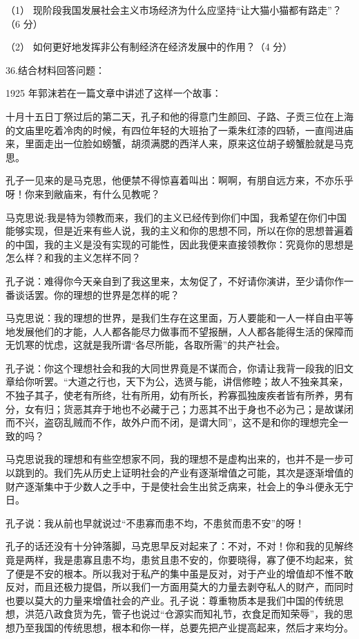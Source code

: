 \documentclass[UTF8,11pt]{ctexart}
\begin{document}
（1） 现阶段我国发展社会主义市场经济为什么应坚持“让大猫小猫都有路走”？（6 分）


（2） 如何更好地发挥非公有制经济在经济发展中的作用？（4 分）


36.结合材料回答问题：

1925 年郭沫若在一篇文章中讲述了这样一个故事：

十月十五日丁祭过后的第二天，孔子和他的得意门生颜回、子路、子贡三位在上海的文庙里吃着冷肉的时候，有四位年轻的大班抬了一乘朱红漆的四轿，一直闯进庙来，里面走出一位脸如螃蟹，胡须满腮的西洋人来，原来这位胡子螃蟹脸就是马克思。

孔子一见来的是马克思，他便禁不得惊喜着叫出：啊啊，有朋自远方来，不亦乐乎呀！你来到敝庙来，有什么见教呢？

马克思说:我是特为领教而来，我们的主义已经传到你们中国，我希望在你们中国能够实现，但是近来有些人说，我的主义和你的思想不同，所以在你的思想普遍着的中国，我的主义是没有实现的可能性，因此我便来直接领教你：究竟你的思想是怎么样？和我的主义怎样不同？

孔子说：难得你今天亲自到了我这里来，太匆促了，不好请你演讲，至少请你作一番谈话罢。你的理想的世界是怎样的呢？

马克思说：我的理想的世界，是我们生存在这里面，万人要能和一人一样自由平等地发展他们的才能，人人都各能尽力做事而不望报酬，人人都各能得生活的保障而无饥寒的忧虑，这就是我所谓“各尽所能，各取所需”的共产社会。

孔子说：你这个理想社会和我的大同世界竟是不谋而合，你请让我背一段我的旧文章给你听罢。“大道之行也，天下为公，选贤与能，讲信修睦；故人不独亲其亲，不独子其子，使老有所终，壮有所用，幼有所长，矜寡孤独废疾者皆有所养，男有分，女有归；货恶其弃于地也不必藏于己；力恶其不出于身也不必为己；是故谋闭而不兴，盗窃乱贼而不作，故外户而不闭，是谓大同”，这不是和你的理想完全一致的吗？

马克思说我的理想和有些空想家不同，我的理想不是虚构出来的，也并不是一步可以跳到的。我们先从历史上证明社会的产业有逐渐增值之可能，其次是逐渐增值的财产逐渐集中于少数人之手中，于是使社会生出贫乏病来，社会上的争斗便永无宁日。

孔子说：我从前也早就说过“不患寡而患不均，不患贫而患不安”的呀！

孔子的话还没有十分钟落脚，马克思早反对起来了：不对，不对！你和我的见解终竟是两样，我是患寡且患不均，患贫且患不安的，你要晓得，寡了便不均起来，贫了便是不安的根本。所以我对于私产的集中虽是反对，对于产业的增值却不惟不敢反对，而且还极力提倡，所以我们一方面用莫大的力量去剥夺私人的财产，而同时也要以莫大的力量来增值社会的产业。孔子说：尊重物质本是我们中国的传统思想，洪范八政食货为先，管子也说过“仓源实而知礼节，衣食足而知荣辱”，我的思想乃至我国的传统思想，根本和你一样，总要先把产业提高起来，然后才来均分。
\end{document}
